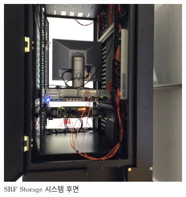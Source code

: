 \documentclass[11pt
  , a4paper
  , article
  , oneside
]{memoir}
\begin{document}
\begin{figure}[h!]
	\centering
	\includegraphics[width=0.85\textwidth]{./images/srfdb_back.eps}
	\caption{SRF Storage 시스템 후면}
	\label{fig:srfdb_back} 
\end{figure}

\clearpage



\end{document}
